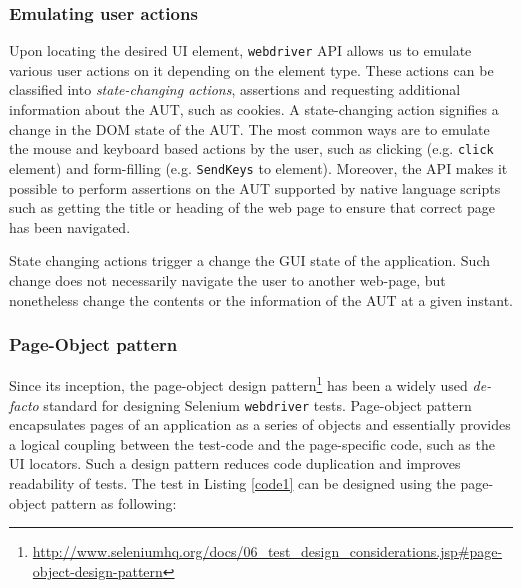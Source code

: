 \subsubsection*{Emulating user actions}
\label{sssec:emulatingActions}
Upon locating the desired UI element, \texttt{webdriver} API allows us to emulate various user actions on it depending on the element type. These actions can be classified into \textit{state-changing actions}, assertions and requesting additional information about the AUT, such as cookies. A state-changing action signifies a change in the DOM state of the AUT. The most common ways are to emulate the mouse and keyboard based actions by the user, such as clicking (e.g. \texttt{click} element) and form-filling (e.g. \texttt{SendKeys} to element). Moreover, the API makes it possible to perform assertions on the AUT supported by native language scripts such as getting the title or heading of the web page to ensure that correct page has been navigated. 

State changing actions trigger a change the GUI state of the application. Such change does not necessarily navigate the user to another web-page, but nonetheless change the contents or the information of the AUT at a given instant.

\subsubsection*{Page-Object pattern}
\label{page-object}
Since its inception, the page-object design pattern\footnote{\url{http://www.seleniumhq.org/docs/06_test_design_considerations.jsp\#page-object-design-pattern}} has been a widely used \textit{de-facto} standard for designing Selenium \texttt{webdriver} tests. 
Page-object pattern encapsulates pages of an application as a series of objects and essentially provides a logical coupling between the test-code and the page-specific code, such as the UI locators. Such a design pattern reduces code duplication and improves readability of tests. The test in Listing \ref{code1} can be designed using the page-object pattern as following: 

